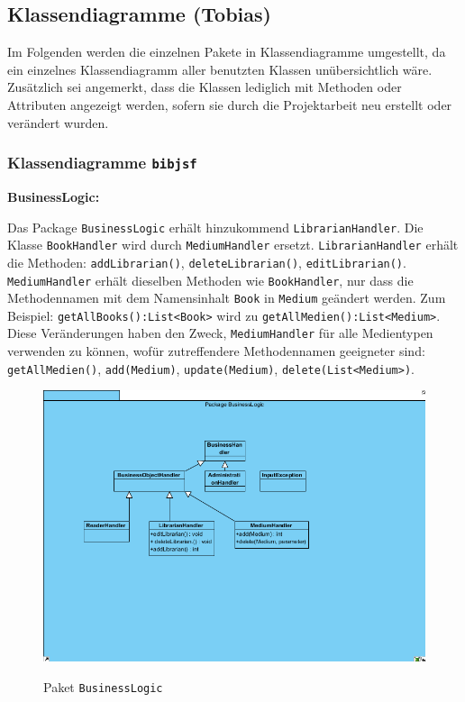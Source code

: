 \documentclass[fontsize=12pt,paper=a4,twoside]{scrartcl}
\begin{document}
\subsection{Klassendiagramme (Tobias)}

Im Folgenden werden die einzelnen Pakete in Klassendiagramme umgestellt, da 
ein einzelnes Klassendiagramm aller benutzten Klassen unübersichtlich wäre.
Zusätzlich sei angemerkt, dass die Klassen lediglich mit Methoden oder Attributen
angezeigt werden, sofern sie durch die Projektarbeit neu erstellt oder verändert wurden.
\newpage
\subsubsection{Klassendiagramme \texttt{bibjsf}}

\textbf{BusinessLogic:}

Das Package \texttt{BusinessLogic} erhält hinzukommend \texttt{LibrarianHandler}. Die Klasse
\texttt{BookHandler} wird durch \texttt{MediumHandler} ersetzt.
\texttt{LibrarianHandler} erhält die Methoden:
\texttt{addLibrarian()},
\texttt{deleteLibrarian()},
\texttt{editLibrarian()}. \\
\texttt{MediumHandler} erhält dieselben Methoden wie \texttt{BookHandler}, nur dass die Methodennamen 
mit dem Namensinhalt \texttt{Book} in \texttt{Medium} geändert werden. Zum Beispiel:
\texttt{getAllBooks():List<Book>} wird zu  \texttt{getAllMedien():List<Medium>}. Diese Veränderungen haben den Zweck, \texttt{MediumHandler} für alle Medientypen verwenden zu können, wofür zutreffendere Methodennamen geeigneter sind:
\texttt{getAllMedien()},
\texttt{add(Medium)},
\texttt{update(Medium)},
\texttt{delete(List<Medium>)}.

\begin{figure} [H] 
\caption{Paket \texttt{BusinessLogic}} \centering
 \includegraphics[width=1\textwidth]{Diagramme/BusinessLogic.png} 
 \label{BusinessLogic} 
\end{figure}
\end{document}
